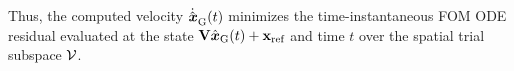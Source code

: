 \documentclass[3p,computermodern,10pt]{elsarticle}
\begin{document}
Thus, the computed velocity $\dot{\hat{ \boldsymbol x}}_{\text{G}}^{}(t)$ minimizes the
time-instantaneous FOM ODE residual evaluated at the state $\mathbf {V}
\hat{ \boldsymbol x}_{\text{G}}(t) + \mathbf{x}_\text{ref}$ and time $t$ over the spatial trial
subspace $\mathcal{V }$.
\end{document}
